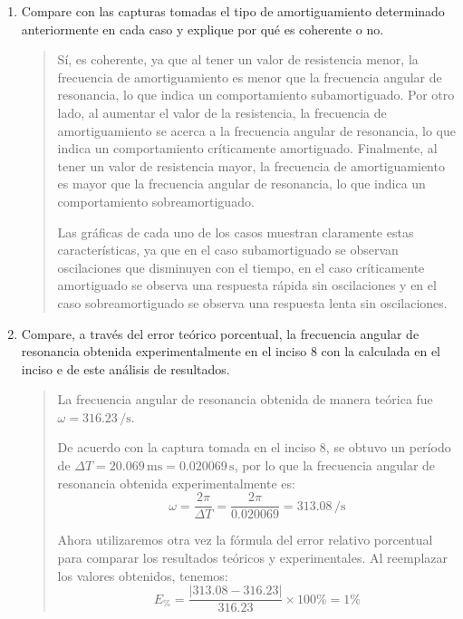 \documentclass{article}
\begin{document}
\begin{enumerate}[label=\alph*.-]
\begin{quote}
            Este caso es el criticamente amortiguado, ya que $\alpha = \omega$.

            Resistencia $R_1 = 0.5\,\unit{\ohm}$:
            \[
                \alpha = 25\,\si{\per\second}
            \]

            Este último caso es el subamortiguado, ya que $\alpha < \omega$.
        \end{quote}

        \item Compare con las capturas tomadas el tipo de amortiguamiento determinado anteriormente en cada caso y explique por qué es coherente o no.
        
        \begin{quote}
            Sí, es coherente, ya que al tener un valor de resistencia menor, la frecuencia de amortiguamiento es menor que la frecuencia angular de resonancia, lo que indica un comportamiento subamortiguado. Por otro lado, al aumentar el valor de la resistencia, la frecuencia de amortiguamiento se acerca a la frecuencia angular de resonancia, lo que indica un comportamiento críticamente amortiguado. Finalmente, al tener un valor de resistencia mayor, la frecuencia de amortiguamiento es mayor que la frecuencia angular de resonancia, lo que indica un comportamiento sobreamortiguado.

            Las gráficas de cada uno de los casos muestran claramente estas características, ya que en el caso subamortiguado se observan oscilaciones que disminuyen con el tiempo, en el caso críticamente amortiguado se observa una respuesta rápida sin oscilaciones y en el caso sobreamortiguado se observa una respuesta lenta sin oscilaciones.
        \end{quote}

        \item Compare, a través del error teórico porcentual, la frecuencia angular de resonancia obtenida experimentalmente en el inciso 8 con la calculada en el inciso e de este análisis de resultados.
        
        \begin{quote}
            La frecuencia angular de resonancia obtenida de manera teórica fue $\omega = 316.23\,\si{\per\second}$.

            De acuerdo con la captura tomada en el inciso 8, se obtuvo un período de $\Delta T = 20.069\,\unit{\milli\second} = 0.020069\,\unit{\second}$, por lo que la frecuencia angular de resonancia obtenida experimentalmente es:
            \[
                \omega = \frac{2\pi}{\Delta T} = \frac{2\pi}{0.020069} = 313.08\,\unit{\per\second}
            \]

            Ahora utilizaremos otra vez la fórmula del error relativo porcentual para comparar los resultados teóricos y experimentales. Al reemplazar los valores obtenidos, tenemos:
            \[
                E_{\%} = \frac{\left|313.08 - 316.23\right|}{316.23} \times 100\% = 1\%
            \]
        \end{quote}
    \end{enumerate}
\end{document}
